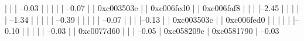                           |          |          |                      --0.03%
                          |          |          |          
                          |          |           --0.07%
                          |          |                     0xc003503c
                          |          |                     0xc006fed0
                          |          |                     0xc006faf8
                          |          |          
                          |          |--2.45%
                          |          |          |          
                          |          |           --1.34%
                          |          |                     |          
                          |          |                      --0.39%
                          |          |                                |          
                          |          |                                 --0.07%
                          |          |          
                          |          |--0.13%
                          |          |          0xc003503c
                          |          |          0xc006fed0
                          |          |          |          
                          |          |          |--0.10%
                          |          |          |          
                          |          |           --0.03%
                          |          |                     0xc0077d60
                          |          |          
                          |           --0.05%
                          |                     0xc058209c
                          |                     0xc0581790
                          |          
                           --0.03%

